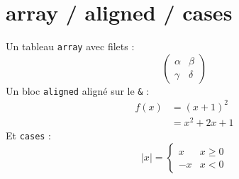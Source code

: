 \documentclass{article}
\begin{document}
\hsize=380pt
\section{array / aligned / cases}
Un tableau \texttt{array} avec filets :
\[ \left(\begin{array}{|c|c|} \alpha & \beta \\ \gamma & \delta \end{array}\right) \]
Un bloc \texttt{aligned} align\'e sur le \texttt{\&} :
\[ \begin{aligned} f(x) &= (x+1)^2 \\ &= x^2 + 2x + 1 \end{aligned} \]
Et \texttt{cases} : \[ |x| = \begin{cases} x & x \ge 0 \\ -x & x < 0 \end{cases} \]
\end{document}
